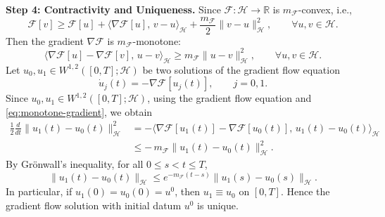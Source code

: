 \documentclass[10pt,a4paper]{amsart}
\renewenvironment{proof}{\par\noindent{\bf Proof\ }}{\hfill\BlackBoxProof\par\medskip}
\begin{document}
\begin{proof}
\noindent \textbf{Step 4: Contractivity and Uniqueness.} Since $\mathcal F:\mathcal H\to\mathbb R$ is $m_{\mathcal F}$-convex, i.e.,
\[
\mathcal F[v]\ge \mathcal F[u]
+\langle \nabla\mathcal F[u],\,v-u\rangle_{\mathcal H}
+\frac{m_{\mathcal F}}{2}\|v-u\|_{\mathcal H}^2,
\qquad \forall u,v\in\mathcal H.
\]
Then the gradient $\nabla\mathcal F$ is $m_{\mathcal F}$-monotone:
\begin{equation}\label{eq:monotone-gradient}
\langle \nabla\mathcal F[u]-\nabla\mathcal F[v],\,u-v\rangle_{\mathcal H}
\ge m_{\mathcal F}\|u-v\|_{\mathcal H}^2,
\qquad \forall u,v\in\mathcal H.
\end{equation}
Let $u_0,u_1\in W^{1,2}([0,T];\mathcal H)$ be two solutions of the gradient flow equation
\[
\dot u_j(t)=-\nabla\mathcal F[u_j(t)],
\qquad j=0,1.
\]
Since $u_0,u_1\in W^{1,2}([0,T];\mathcal H)$, using the gradient flow equation and \eqref{eq:monotone-gradient}, we obtain
\[
\begin{aligned}
\frac12\frac{d}{dt}\|u_1(t)-u_0(t)\|_{\mathcal H}^2
&=
-\langle \nabla\mathcal F[u_1(t)]-\nabla\mathcal F[u_0(t)],\,u_1(t)-u_0(t)\rangle_{\mathcal H} \\
&\le
-\,m_{\mathcal F}\|u_1(t)-u_0(t)\|_{\mathcal H}^2 .
\end{aligned}
\]
By Gr\"onwall's inequality, for all $0\le s<t\le T$,
\begin{equation*}
\|u_1(t)-u_0(t)\|_{\mathcal H}
\le e^{-m_{\mathcal F}(t-s)}\|u_1(s)-u_0(s)\|_{\mathcal H}.
\end{equation*}
In particular, if $u_1(0)=u_0(0)=u^0$, then $u_1\equiv u_0$ on $[0,T]$. Hence the gradient flow solution with initial datum $u^0$ is unique.
\end{proof}
\end{document}
